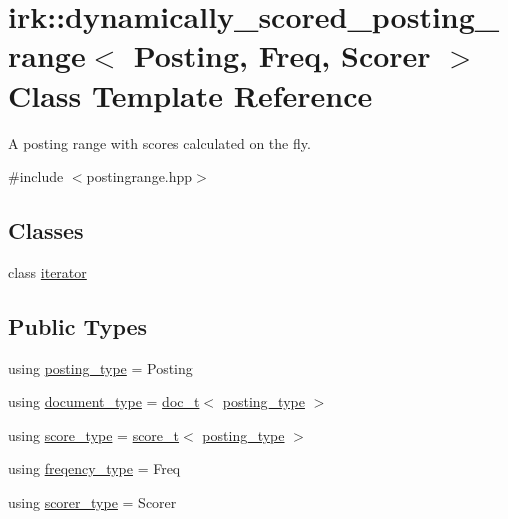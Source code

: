 \hypertarget{classirk_1_1dynamically__scored__posting__range}{}\section{irk\+:\+:dynamically\+\_\+scored\+\_\+posting\+\_\+range$<$ Posting, Freq, Scorer $>$ Class Template Reference}
\label{classirk_1_1dynamically__scored__posting__range}


A posting range with scores calculated on the fly.  




{\ttfamily \#include $<$postingrange.\+hpp$>$}

\subsection*{Classes}
\begin{DoxyCompactItemize}
\item 
class \mbox{\hyperlink{classirk_1_1dynamically__scored__posting__range_1_1iterator}{iterator}}
\end{DoxyCompactItemize}
\subsection*{Public Types}
\begin{DoxyCompactItemize}
\item 
using \mbox{\hyperlink{classirk_1_1dynamically__scored__posting__range_aac074648c23da33107bd6d03dae98ca5}{posting\+\_\+type}} = Posting
\item 
using \mbox{\hyperlink{classirk_1_1dynamically__scored__posting__range_a30b30964cca4601be1eab249b12bd825}{document\+\_\+type}} = \mbox{\hyperlink{namespaceirk_af5d95ec091f3bd711790e71ccb533903}{doc\+\_\+t}}$<$ \mbox{\hyperlink{classirk_1_1dynamically__scored__posting__range_aac074648c23da33107bd6d03dae98ca5}{posting\+\_\+type}} $>$
\item 
using \mbox{\hyperlink{classirk_1_1dynamically__scored__posting__range_aa0c12118410f44552410fbcfd80c6f1b}{score\+\_\+type}} = \mbox{\hyperlink{namespaceirk_a87bce44d1e3fdff0b1b3bb78f2a5f924}{score\+\_\+t}}$<$ \mbox{\hyperlink{classirk_1_1dynamically__scored__posting__range_aac074648c23da33107bd6d03dae98ca5}{posting\+\_\+type}} $>$
\item 
using \mbox{\hyperlink{classirk_1_1dynamically__scored__posting__range_a88d91cba6886a010222dba0a47e11941}{freqency\+\_\+type}} = Freq
\item 
using \mbox{\hyperlink{classirk_1_1dynamically__scored__posting__range_aa82b83ad2a96aeda0fff2cb233d877f9}{scorer\+\_\+type}} = Scorer
\end{DoxyCompactItemize}
